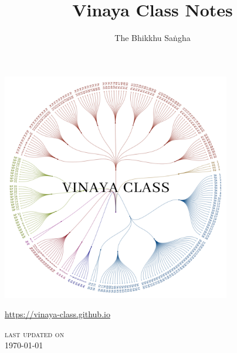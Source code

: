 \documentclass[11pt]{memoir}
\title{Vinaya Class Notes}
\author{The Bhikkhu Saṅgha}
\begin{document}
\frontmatter

\vspace*{-2cm}

{\centering%

\includegraphics[width=10cm]{../../src/includes/figures/vinaya-class-title.w1800.png}

\href{https://vinaya-class.github.io}{https://vinaya-class.github.io}

{\scshape\small last updated on}\\
\today

}

\tableofcontents*



\mainmatter



























\backmatter





% 

% 
\end{document}
